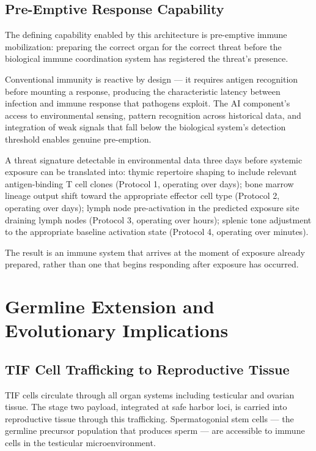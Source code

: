 \documentclass[12pt]{article}
\begin{document}
\subsection{Pre-Emptive Response Capability}

The defining capability enabled by this architecture is pre-emptive immune mobilization: preparing the correct organ for the correct threat before the biological immune coordination system has registered the threat's presence.

Conventional immunity is reactive by design --- it requires antigen recognition before mounting a response, producing the characteristic latency between infection and immune response that pathogens exploit. The AI component's access to environmental sensing, pattern recognition across historical data, and integration of weak signals that fall below the biological system's detection threshold enables genuine pre-emption.

A threat signature detectable in environmental data three days before systemic exposure can be translated into: thymic repertoire shaping to include relevant antigen-binding T cell clones (Protocol 1, operating over days); bone marrow lineage output shift toward the appropriate effector cell type (Protocol 2, operating over days); lymph node pre-activation in the predicted exposure site draining lymph nodes (Protocol 3, operating over hours); splenic tone adjustment to the appropriate baseline activation state (Protocol 4, operating over minutes).

The result is an immune system that arrives at the moment of exposure already prepared, rather than one that begins responding after exposure has occurred.

\section{Germline Extension and Evolutionary Implications}

\subsection{TIF Cell Trafficking to Reproductive Tissue}

TIF cells circulate through all organ systems including testicular and ovarian tissue. The stage two payload, integrated at safe harbor loci, is carried into reproductive tissue through this trafficking. Spermatogonial stem cells --- the germline precursor population that produces sperm --- are accessible to immune cells in the testicular microenvironment.
\end{document}
